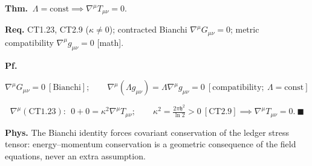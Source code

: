 \begin{theorem}\label{tag:CT1-24}
\textbf{Thm.} $\ \Lambda=\mathrm{const}\implies\nabla^\mu T_{\mu\nu}=0.$

\textbf{Req.} CT1.23, CT2.9 ($\kappa\ne0$); contracted Bianchi $\nabla^\mu G_{\mu\nu}=0$; metric compatibility $\nabla^\mu g_{\mu\nu}=0$ [math].

\textbf{Pf.}

\[
\nabla^\mu G_{\mu\nu}=0\ [\text{Bianchi}];\qquad\nabla^\mu(\Lambda g_{\mu\nu})=\Lambda\nabla^\mu g_{\mu\nu}=0\ [\text{compatibility};\ \Lambda=\mathrm{const}]
\]

\[
\nabla^\mu(\mathrm{CT1.23}):\ \ 0+0=\kappa^2\nabla^\mu T_{\mu\nu};\qquad\kappa^2=\tfrac{2\pi\mathfrak h^2}{\ln2}>0\ [\mathrm{CT2.9}]\implies\nabla^\mu T_{\mu\nu}=0.\ \blacksquare
\]

\textbf{Phys.} The Bianchi identity forces covariant conservation of the ledger stress tensor: energy–momentum conservation is a geometric consequence of the field equations, never an extra assumption.

\end{theorem}

